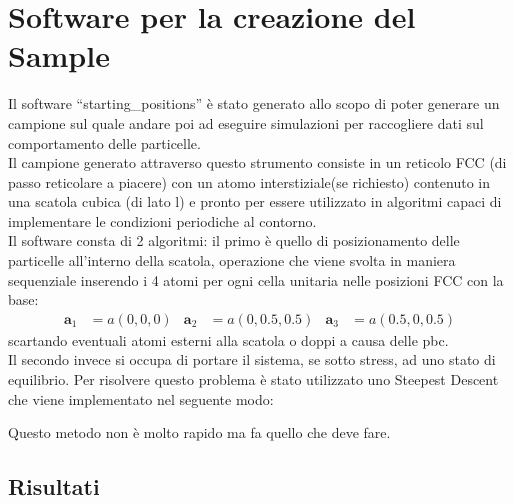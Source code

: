\documentclass[a4paper,11pt]{article}
\begin{document}
	\section{Software per la creazione del Sample} %
	\label{sec:software_per_la_creazione_del_sample}
		Il software ``starting\_positions'' è stato generato allo scopo di poter 
		generare un campione sul quale andare poi ad eseguire simulazioni per
		raccogliere dati sul comportamento delle particelle.\\
		Il campione generato attraverso questo strumento consiste in un reticolo
		FCC (di passo reticolare a piacere) con un atomo interstiziale(se 
		richiesto) contenuto in una scatola cubica (di lato l) e pronto per
		essere utilizzato in algoritmi capaci di implementare le condizioni periodiche al contorno.\\
		Il software consta di 2 algoritmi: il primo è quello di posizionamento 
		delle particelle all'interno della scatola, operazione che viene svolta
		in maniera sequenziale inserendo i 4 atomi per ogni cella unitaria nelle 
		posizioni FCC con la base:
		\begin{align}
			\mathbf a_1  &= a(0,0,0) & 
			\mathbf a_2  &= a(0,0.5,0.5) &
			\mathbf a_3  &= a(0.5,0,0.5) 
		\end{align}
		scartando eventuali atomi esterni alla scatola o doppi a causa delle pbc.\\
		Il secondo invece si occupa di portare il sistema, se sotto stress, ad uno 
		stato di equilibrio. Per risolvere questo problema è stato utilizzato uno 
		Steepest Descent che viene implementato nel seguente modo:
		\begin{center}
	    \end{center}
	    Questo metodo non è molto rapido ma fa quello che deve fare.
	\subsection{Risultati} %
	\label{sub:risultati}
	
\end{document}
